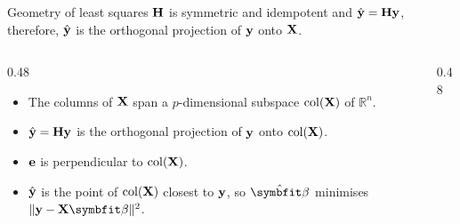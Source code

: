 \begin{frame}{Geometry of least squares}
    \(\mathbf{H}\) is symmetric and idempotent and \(\hat{\mathbf{y}} = \mathbf{H}\mathbf{y}\), therefore, \(\hat{\mathbf{y}}\) is the orthogonal projection of \(\mathbf{y}\) onto \(\mathbf{X}\).
    \begin{columns}[T]
        \begin{column}{0.48\textwidth}
            \begin{itemize}
                \item The columns of $\mathbf{X}$ span a $p$-dimensional subspace $\operatorname{col}(\mathbf{X})$ of $\mathbb R^n$.
                \item $\hat{\mathbf{y}}=\mathbf{H}\mathbf{y}$ is the orthogonal projection of $\mathbf{y}$ onto $\operatorname{col}(\mathbf{X})$.
                \item $\mathbf{e}$ is perpendicular to $\operatorname{col}(\mathbf{X})$.
                \item $\hat{\mathbf{y}}$ is the point of $\operatorname{col}(\mathbf{X})$ closest to $\mathbf{y}$, so $\hat{\bbeta}$ minimises $\|\by-\bX\bbeta\|^2$.
            \end{itemize}
        \end{column}
        \begin{column}{0.48\textwidth}
            \begin{center}
            \end{center}
        \end{column}
    \end{columns}
\end{frame}


